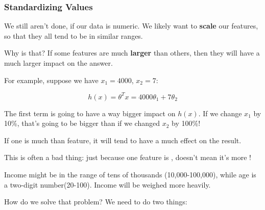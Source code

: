             \subsecdiv
            \subsubsection{Standardizing Values}
    
                We still aren't done, if our data is numeric. We likely want to \textbf{scale} our features, so that they all tend to be in similar ranges.
    
                Why is that? If some features are much \textbf{larger} than others, then they will have a much larger impact on the answer.

                For example, suppose we have $x_1=4000$, $x_2=7$:

                \begin{equation}
                    h(x) = \theta^Tx = 4000\theta_1 + 7\theta_2
                \end{equation}

                The first term is going to have a way bigger impact on $h(x)$. If we change $x_1$ by 10\%, that's going to be bigger than if we changed $x_2$ by 100\%!
                    \\
    
                \begin{concept}
                    If one  is much  than  feature, it will tend to have a much  effect on the result.

                    This is often a bad thing: just because one feature is , doesn't mean it's more !
                \end{concept}

                \miniex Income might be in the range of tens of thousands (10,000-100,000), while age is a two-digit number(20-100). Income will be weighed more heavily.

                How do we solve that problem? We need to do two things:


